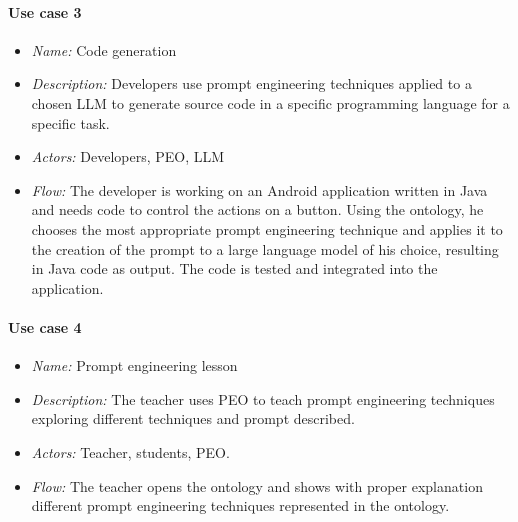 \paragraph{Use case 3}
\begin{itemize}
    \item \textit{Name:} Code generation
    \item \textit{Description:} Developers use prompt engineering techniques applied to a chosen LLM to generate source code in a specific programming language for a specific task.
    \item \textit{Actors:} Developers, PEO, LLM
    \item \textit{Flow:} The developer is working on an Android application written in Java and needs code to control the actions on a button. Using the ontology, he chooses the most appropriate prompt engineering technique and applies it to the creation of the prompt to a large language model of his choice,  resulting in Java code as output. The code is tested and integrated into the application. 
\end{itemize}

\paragraph{Use case 4}
\begin{itemize}
    \item \textit{Name:} Prompt engineering lesson
    \item \textit{Description:} The teacher uses PEO to teach prompt engineering techniques exploring different techniques and prompt described.
    \item \textit{Actors:} Teacher, students, PEO. 
    \item \textit{Flow:} The teacher opens the ontology and shows with proper explanation different prompt engineering techniques represented in the ontology.
\end{itemize}

